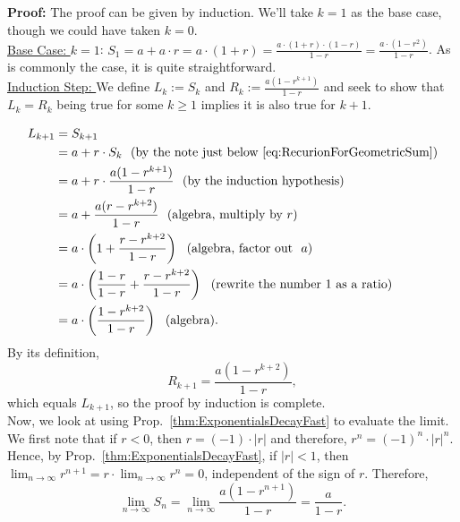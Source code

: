 \textbf{Proof:} The proof can be given by induction. We'll take $k=1$ as the base case, though we could have taken $k=0$. \\

\ul{Base Case: $k=1$}: $S_1 = a + a\cdot r = a \cdot (1 + r) = \frac{a\cdot (1 + r) \cdot(1 - r)}{1 - r}=  \frac{a\cdot(1 - r^2)}{1 - r}$. As is commonly the case, it is quite straightforward.\\

\ul{Induction Step: } We define $L_k := S_k$ and $R_k := \frac{a(1 - r^{k+1})}{1 - r}$ and seek to show that $L_k = R_k$ being true for some $k\ge 1$ implies it is also true for $k+1$.

\begin{align*}
    L_{k+1} &= S_{k+1} \\
    & = a + r \cdot S_k ~~(\text{by the note just below \eqref{eq:RecurionForGeometricSum}})\\
    & = a + r \cdot \frac{a(1 - r^{k+1})}{1 - r} ~~(\text{by the induction hypothesis})\\
    & = a  + \frac{a(r - r^{k+2})}{1 - r} ~~(\text{algebra, multiply by } r)\\
    & = a \cdot\left( 1  + \frac{r - r^{k+2}}{1 - r}\right)~~(\text{algebra, factor out}~~a)\\
    & = a \cdot \left( \frac{1-r}{1-r}  + \frac{r - r^{k+2}}{1 - r} \right)~~(\text{rewrite the number 1 as a ratio})\\
    & = a \cdot \left( \frac{1 - r^{k+2}}{1 - r} \right) ~~(\text{algebra}).    
\end{align*}
By its definition, 
$$R_{k+1} = \frac{a(1 - r^{k+2})}{1 - r},$$
which equals $L_{k+1}$, so the proof by induction is complete. \\

Now, we look at using Prop.~\ref{thm:ExponentialsDecayFast} to evaluate the limit. We first note that if $r<0$, then $r = (-1) \cdot|r|$ and therefore, $r^n = (-1)^n \cdot|r|^n$. Hence, by Prop.~\ref{thm:ExponentialsDecayFast}, if $|r|<1$, then $\displaystyle \lim_{n\to \infty} r^{n+1} = r \cdot \lim_{n\to \infty} r^{n} =0$, independent of the sign of $r$. Therefore, 
$$\lim_{n\to \infty} S_n = \lim_{n\to \infty}  \frac{a(1 - r^{n+1})}{1 - r} = \frac{a}{1 - r}.$$
\Qed

\bigskip

